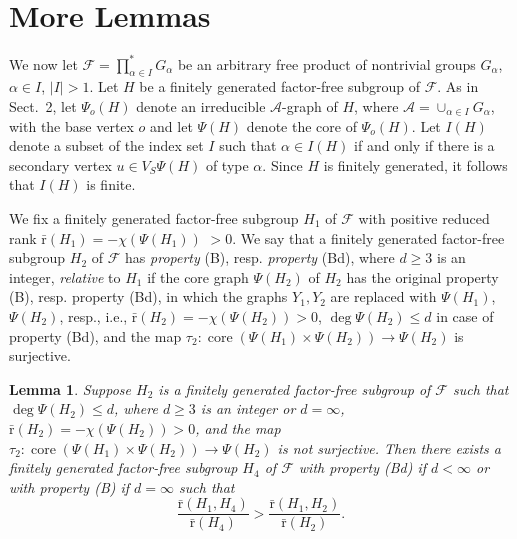 \documentclass[10pt, reqno]{amsart}
\numberwithin{equation}{section}
\newtheorem{lem}[thm]{Lemma}
\begin{document}
\section{More Lemmas}

We now let ${\mathcal{F}} = \prod_{{\alpha} \in I}^* G_{\alpha}$ be  an arbitrary free product of nontrivial groups  $G_{\alpha}$,  ${\alpha} \in I$, $|I| >1$. Let $H$ be a finitely generated factor-free subgroup of  ${\mathcal{F}}$. As in Sect.~2, let $\Psi_o(H)$ denote an irreducible
${\mathcal{A}}$-graph  of $H$, where ${\mathcal{A}} =   \cup_{{\alpha} \in I} G_{\alpha}$,  with the base vertex $o$ and
let $\Psi(H)$ denote the core of  $\Psi_o(H)$.
Let $I(H)$ denote a subset of  the index set $I$ such that ${\alpha} \in I(H)$  if and only if  there is a secondary vertex $u \in V_S \Psi(H)$ of type ${\alpha}$. Since $H$ is finitely generated,  it follows that  $I(H)$ is finite.

We fix a finitely generated factor-free subgroup $H_1$ of  ${\mathcal{F}}$ with positive reduced rank
${\bar {\mathrm{r}}}(H_1) = -\chi(\Psi(H_1))$ $>0$.  We say that a  finitely generated factor-free subgroup $H_2$ of  ${\mathcal{F}}$ has  {\em property }(B), resp. {\em property } (Bd),  where $d \ge 3$ is an integer, {\em  relative} to $H_1$  if the core graph $\Psi(H_2)$ of $H_2$ has the original property (B), resp.  property (Bd), in which the graphs $Y_1, Y_2$ are replaced with $\Psi(H_1)$,  $\Psi(H_2)$, resp., i.e., ${\bar {\mathrm{r}}}(H_2) = -\chi(\Psi(H_2)) >0$, $\deg \Psi(H_2)  \le d$ in case of property (Bd), and  the map
$\tau_2 : \operatorname{core} (\Psi(H_1) \times \Psi(H_2)) \to  \Psi(H_2)$ is surjective.

\begin{lem}\label{lemBd} Suppose $H_2$ is a  finitely generated factor-free subgroup of  ${\mathcal{F}}$ such that
$\deg \Psi(H_2) \le d$,  where $d \ge 3$ is an integer or $d = \infty$,  ${\bar {\mathrm{r}}}(H_2) = -\chi(\Psi(H_2)) >0$, and the map  $\tau_2 :  \operatorname{core} (\Psi(H_1) \times \Psi(H_2)) \to  \Psi(H_2)$ is not surjective. Then there exists a finitely generated factor-free subgroup $H_4$ of  ${\mathcal{F}}$ with property (Bd) if $d < \infty$ or
with property (B) if $d = \infty$  such that
\begin{equation}\label{bol}
    \frac{{\bar {\mathrm{r}}}(H_1, H_4) }{  {\bar {\mathrm{r}}}(H_4) }  >  \frac{{\bar {\mathrm{r}}}(H_1, H_2) }{  {\bar {\mathrm{r}}}(H_2) }  . \end{equation}
\end{lem}
\end{document}
